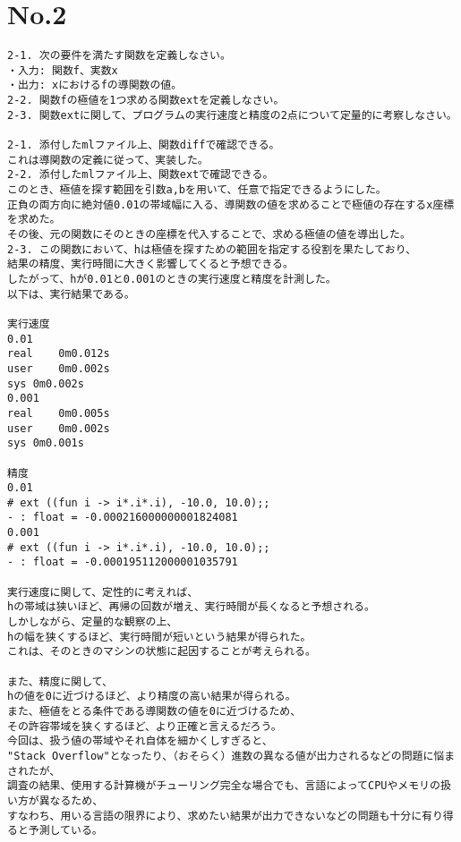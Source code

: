 \documentclass{jarticle}
\begin{document}
\section{No.2}
\begin{verbatim}
2-1. 次の要件を満たす関数を定義しなさい。
・入力: 関数f、実数x
・出力: xにおけるfの導関数の値。
2-2. 関数fの極値を1つ求める関数extを定義しなさい。
2-3. 関数extに関して、プログラムの実行速度と精度の2点について定量的に考察しなさい。

2-1. 添付したmlファイル上、関数diffで確認できる。
これは導関数の定義に従って、実装した。
2-2. 添付したmlファイル上、関数extで確認できる。
このとき、極値を探す範囲を引数a,bを用いて、任意で指定できるようにした。
正負の両方向に絶対値0.01の帯域幅に入る、導関数の値を求めることで極値の存在するx座標を求めた。
その後、元の関数にそのときの座標を代入することで、求める極値の値を導出した。
2-3. この関数において、hは極値を探すための範囲を指定する役割を果たしており、
結果の精度、実行時間に大きく影響してくると予想できる。
したがって、hが0.01と0.001のときの実行速度と精度を計測した。
以下は、実行結果である。

実行速度
0.01
real	0m0.012s
user	0m0.002s
sys	0m0.002s
0.001
real	0m0.005s
user	0m0.002s
sys	0m0.001s

精度
0.01
# ext ((fun i -> i*.i*.i), -10.0, 10.0);;
- : float = -0.000216000000001824081
0.001
# ext ((fun i -> i*.i*.i), -10.0, 10.0);;
- : float = -0.000195112000001035791

実行速度に関して、定性的に考えれば、
hの帯域は狭いほど、再帰の回数が増え、実行時間が長くなると予想される。
しかしながら、定量的な観察の上、
hの幅を狭くするほど、実行時間が短いという結果が得られた。
これは、そのときのマシンの状態に起因することが考えられる。

また、精度に関して、
hの値を0に近づけるほど、より精度の高い結果が得られる。
また、極値をとる条件である導関数の値を0に近づけるため、
その許容帯域を狭くするほど、より正確と言えるだろう。
今回は、扱う値の帯域やそれ自体を細かくしすぎると、
"Stack Overflow"となったり、（おそらく）進数の異なる値が出力されるなどの問題に悩まされたが、
調査の結果、使用する計算機がチューリング完全な場合でも、言語によってCPUやメモリの扱い方が異なるため、
すなわち、用いる言語の限界により、求めたい結果が出力できないなどの問題も十分に有り得ると予測している。
\end{verbatim}

\newpage
\end{document}
